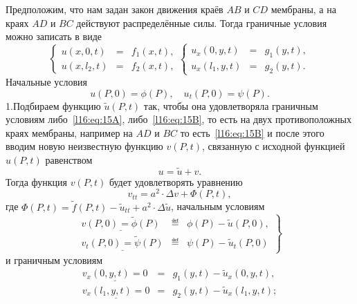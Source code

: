 Предположим, что нам задан закон движения краёв $AB$ и $CD$ мембраны, а на краях $AD$ и $BC$ действуют распределённые силы. Тогда граничные условия можно записать в виде
\begin{subequations}
	\renewcommand{\theequation}{\theparentequation\Alph{equation}}
	\begin{equation}\label{l16:eq:15A}
		\left\{\begin{array}{rcl}
			u(x,0,t)&=&f_1(x,t),\\
			u(x,l_2,t)&=&f_2(x,t),
		\end{array}\right.
	\end{equation}
	\begin{equation}\label{l16:eq:15B}
		\left\{\begin{array}{rcl}
			u_x(0,y,t)&=&g_1(y,t),\\
			u_x(l_1,y,t)&=&g_2(y,t).
		\end{array}\right.
	\end{equation}
\end{subequations}
Начальные условия 
\begin{equation}\label{l16:eq:16}
	 u(P,0)=\phi(P),\quad u_t(P,0)=\psi(P).
\end{equation}
1.\quad Подбираем функцию $\widetilde{u}(P,t)$ так, чтобы она удовлетворяла граничным условиям либо~\eqref{l16:eq:15A}, либо~\eqref{l16:eq:15B}, то есть на двух противоположных краях мембраны, например на $AD$ и $BC$ то есть~\eqref{l16:eq:15B} и после этого вводим новую неизвестную функцию $v(P,t)$, связанную с исходной функцией $u(P,t)$ равенством 
\begin{equation}\label{l16:eq:17}
	 u=\widetilde{u}+v.
\end{equation}
Тогда функция $v(P,t)$ будет удовлетворять уравнению
\begin{equation}\label{l16:eq:18}
	 v_{tt}=a^2\cdot\Delta v+\Phi(P,t),
\end{equation} 
где $\Phi(P,t)=\widetilde{f}(P,t)-\widetilde{u}_{tt}+a^2\cdot\Delta \widetilde{u}$, начальным условиям 
\begin{equation}\label{l16:eq:19}
	\left.\begin{array}{rcl}
		\underline{v(P,0)=\widetilde{\phi}(P)}&\eqdef&\phi(P)-\widetilde{u}(P,0),\\
		\underline{v_t(P,0)=\widetilde{\psi}(P)}&\eqdef&\psi(P)-\widetilde{u}_t(P,0)
	\end{array}\right\} 
\end{equation}
и граничным условиям
\begin{equation}\label{l16:eq:20}
	\begin{array}{rcl}
		\underline{v_x(0,y,t)=0}&=&g_1(y,t)-\widetilde{u}_x(0,y,t),\\
		\underline{v_x(l_1,y,t)=0}&=&g_2(y,t)-\widetilde{u}_x(l_1,y,t);
	\end{array} 
\end{equation}
